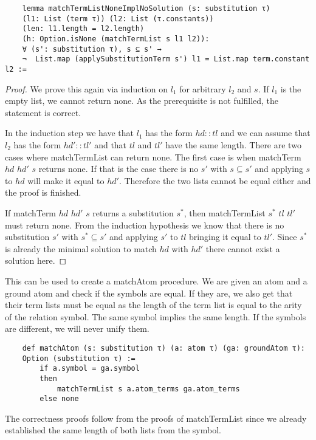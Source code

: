 \begin{lstlisting}
    lemma matchTermListNoneImplNoSolution (s: substitution τ)
    (l1: List (term τ)) (l2: List (τ.constants))
    (len: l1.length = l2.length) 
    (h: Option.isNone (matchTermList s l1 l2)): 
    ∀ (s': substitution τ), s ⊆ s' →
    ¬  List.map (applySubstitutionTerm s') l1 = List.map term.constant l2 :=
\end{lstlisting}
\begin{proof}
    We prove this again via induction on $l_1$ for arbitrary $l_2$ and $s$. If $l_1$ is the empty list, we cannot return none. As the prerequisite is not fulfilled, the statement is correct.

    In the induction step we have that $l_1$ has the form $hd::tl$ and we can assume that $l_2$ has the form $hd'::tl'$ and that $tl$ and $tl'$ have the same length. There are two cases where matchTermList can return none. The first case is when matchTerm $hd$ $hd'$ $s$ returns none. If that is the case there is no $s'$ with $s\subseteq s'$ and applying $s$ to $hd$ will make it equal to $hd'$. Therefore the two lists cannot be equal either and the proof is finished.

    If matchTerm $hd$ $hd'$ $s$ returns a substitution $s^\ast$, then matchTermList $s^\ast$ $tl$ $tl'$ must return none. From the induction hypothesis we know that there is no substitution $s'$ with $s^\ast \subseteq s'$ and applying $s'$ to $tl$ bringing it equal to $tl'$. Since $s^\ast$ is already the minimal solution to match $hd$ with $hd'$ there cannot exist a solution here.
\end{proof}

This can be used to create a matchAtom procedure. We are given an atom and a ground atom and check if the symbols are equal. If they are, we also get that their term lists must be equal as the length of the term list is equal to the arity of the relation symbol. The same symbol implies the same length.
If the symbols are different, we will never unify them.

\begin{lstlisting}
    def matchAtom (s: substitution τ) (a: atom τ) (ga: groundAtom τ):
    Option (substitution τ) :=
        if a.symbol = ga.symbol
        then
            matchTermList s a.atom_terms ga.atom_terms
        else none
\end{lstlisting}

The correctness proofs follow from the proofs of matchTermList since we already established the same length of both lists from the symbol.


